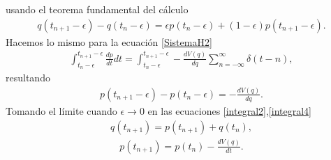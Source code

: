 usando el teorema fundamental del cálculo
\begin{eqnarray}
q(t_{n+1}-\epsilon)-q(t_{n}-\epsilon)=\epsilon p(t_{n}-\epsilon)+(1-\epsilon)p(t_{n+1}-\epsilon).
\label{integral2}
\end{eqnarray}
Hacemos lo mismo para la ecuación \eqref{SistemaH2}
\begin{eqnarray}
\int_{t_{n}-\epsilon}^{t_{n+1}-\epsilon}\frac{dp}{dt}dt=\int_{t_{n}-\epsilon}^{t_{n+1}-\epsilon}-\frac{dV(q)}{dq}\sum_{n=-\infty}^{\infty}\delta(t-n),
\label{integral3}
\end{eqnarray}
resultando
\begin{eqnarray}
p(t_{n+1}-\epsilon)-p(t_{n}-\epsilon)=-\frac{dV(q)}{dq}.
\label{integral4}
\end{eqnarray}
Tomando el límite cuando $\epsilon\rightarrow 0$ en las ecuaciones \eqref{integral2},\eqref{integral4} 
\begin{eqnarray}
q(t_{n+1})=p(t_{n+1})+q(t_{n}),
\label{sistema hamilton a}
\end{eqnarray}
\begin{eqnarray}
p(t_{n+1})=p(t_{n})-\frac{dV(q)}{dt}.
\label{sistema hamilton b}
\end{eqnarray}






